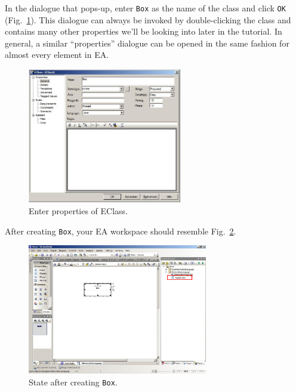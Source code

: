\clearpage

In the dialogue that pops-up, enter \texttt{Box} as the name of the class and
click \texttt{OK} (Fig.~\ref{fig:eclass_properties}).  This dialogue can
always be invoked by double-clicking the class and contains many other
properties we'll be looking into later in the tutorial.  In general, a similar
``properties'' dialogue can be opened in the same fashion for almost every
element in EA.

\begin{figure}[htbp]
	\centering
  \includegraphics[width=0.6\textwidth]{pics/memBoxBilder/memBox08.png}
	\caption{Enter properties of EClass.}
	\label{fig:eclass_properties}
\end{figure}

After creating \texttt{Box}, your EA workspace should resemble
Fig.~\ref{fig:eclass_completed}. 

\begin{figure}[htbp]
	\centering
  \includegraphics[width=0.7\textwidth]{pics/memBoxBilder/memBox09.png}
	\caption{State after creating \texttt{Box}.}
	\label{fig:eclass_completed}
\end{figure}

\clearpage

